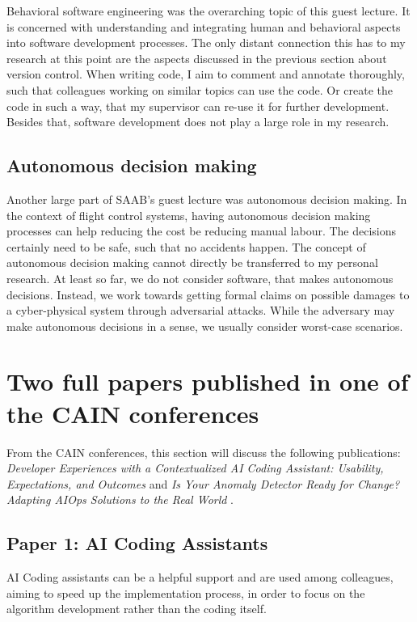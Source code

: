 \documentclass[11pt]{article}
\begin{document}
Behavioral software engineering was the overarching topic of this guest lecture. It is concerned with understanding and integrating human and behavioral aspects into software development processes. 
The only distant connection this has to my research at this point are the aspects discussed in the previous section about version control. When writing code, I aim to comment and annotate thoroughly, such that colleagues working on similar topics can use the code. Or create the code in such a way, that my supervisor can re-use it for further development. 
Besides that, software development does not play a large role in my research. 


\subsection{Autonomous decision making}

Another large part of SAAB's guest lecture was autonomous decision making. 
In the context of flight control systems, having autonomous decision making processes can help reducing the cost be reducing manual labour. The decisions certainly need to be safe, such that no accidents happen. 
The concept of autonomous decision making cannot directly be transferred to my personal research. At least so far, we do not consider software, that makes autonomous decisions. Instead, we work towards getting formal claims on possible damages to a cyber-physical system through adversarial attacks. 
While the adversary may make autonomous decisions in a sense, we usually consider worst-case scenarios.

\section{Two full papers published in one of the CAIN conferences}

From the CAIN conferences, this section will discuss the following publications:
\textit{Developer Experiences with a Contextualized AI Coding Assistant: Usability, Expectations, and Outcomes} \cite{pinto_developer_2024} and 
\textit{Is Your Anomaly Detector Ready for Change? Adapting AIOps Solutions to the Real World} \cite{poenaru-olaru_is_2024}.

\subsection{Paper 1: AI Coding Assistants}

AI Coding assistants can be a helpful support and are used among colleagues, aiming to speed up the implementation process, in order to focus on the algorithm development rather than the coding itself.
\end{document}
